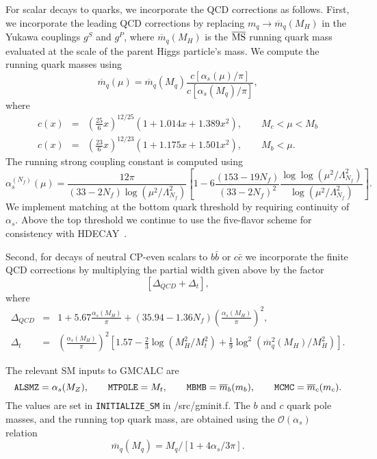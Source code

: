 \documentclass[11pt]{article}
\begin{document}
For scalar decays to quarks, we incorporate the QCD corrections as follows.
First, we incorporate the leading QCD corrections by replacing $m_q \to \overline m_q(M_H)$ in the Yukawa couplings $g^S$ and $g^P$, where $\overline m_q(M_H)$ is the $\overline{\rm MS}$ running quark mass evaluated at the scale of the parent Higgs particle's mass.  We compute the running quark masses using~\cite{Djouadi:1995gt}
\begin{equation}
	\overline m_q(\mu) = \overline m_q(M_q) \frac{c[\alpha_s(\mu)/\pi]}{c[\alpha_s(M_q)/\pi]},
\end{equation}
where
\begin{eqnarray}
	c(x) &=& \left( \frac{25}{6}x \right)^{12/25} (1 + 1.014 x + 1.389 x^2), 
		\qquad M_c < \mu < M_b \nonumber \\
	c(x) &=& \left( \frac{23}{6} x \right)^{12/23} (1 + 1.175 x + 1.501 x^2),
		\qquad M_b < \mu.
\end{eqnarray}
The running strong coupling constant is computed using~\cite{Djouadi:1995gt}
\begin{equation}
	\alpha_s^{(N_f)}(\mu) = \frac{12 \pi}{(33 - 2N_f) \log(\mu^2/\Lambda_{N_f}^2)}
		\left[ 1 - 6 \frac{(153 - 19N_f)}{(33 - 2N_f)^2} 
		\frac{\log \log(\mu^2/\Lambda_{N_f}^2)}{\log(\mu^2/\Lambda_{N_f}^2)} \right].
\end{equation}
We implement matching at the bottom quark threshold by requiring continuity of $\alpha_s$.
Above the top threshold we continue to use the five-flavor scheme for consistency with HDECAY~\cite{Djouadi:1997yw}.

Second, for decays of neutral CP-even scalars to $b \bar b$ or $c \bar c$ we incorporate the finite QCD corrections by multiplying the partial width given above by the factor~\cite{Djouadi:1995gt}
\begin{equation}
	\left[ \Delta_{QCD} + \Delta_t \right],
\end{equation}
where
\begin{eqnarray}
	\Delta_{QCD} &=& 1 + 5.67 \frac{\alpha_s(M_H)}{\pi}
		+ (35.94 - 1.36 N_f) \left( \frac{\alpha_s(M_H)}{\pi} \right)^2, \nonumber \\
	\Delta_t &=& \left( \frac{\alpha_s(M_H)}{\pi} \right)^2 
		\left[ 1.57 - \frac{2}{3} \log(M_H^2/M_t^2) 
		+ \frac{1}{9} \log^2 (\overline m_q^2(M_H)/M_H^2) \right].
\end{eqnarray}

The relevant SM inputs to GMCALC are 
\begin{equation}
	{\tt ALSMZ} = \alpha_s(M_Z), \qquad {\tt MTPOLE} = M_t, \qquad
	{\tt MBMB} = \overline m_b(m_b), \qquad {\tt MCMC} = \overline m_c(m_c).
\end{equation}
The values are set in {\tt INITIALIZE\_SM} in /src/gminit.f.
The $b$ and $c$ quark pole masses, and the running top quark mass, are obtained using the $\mathcal{O}(\alpha_s)$ relation~\cite{Djouadi:1995gt}
\begin{equation}
	\overline m_q(M_q) = M_q / [1 + 4 \alpha_s / 3 \pi].
\end{equation}
\end{document}
